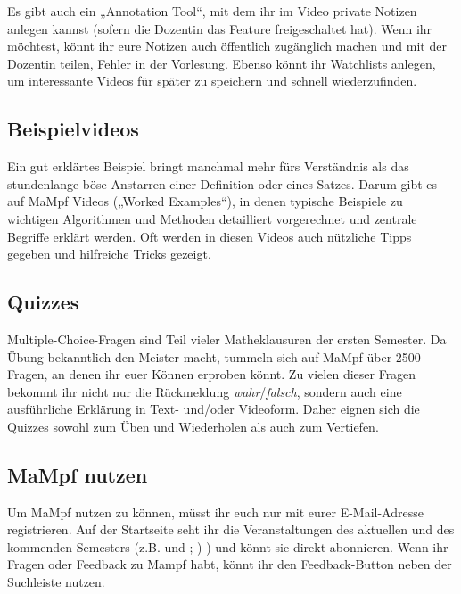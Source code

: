 Es gibt auch ein „Annotation Tool“, mit dem ihr im Video private Notizen anlegen kannst (sofern die Dozentin das Feature freigeschaltet hat). Wenn ihr möchtest, könnt ihr eure Notizen auch öffentlich zugänglich machen und mit der Dozentin teilen, \zB Fehler in der Vorlesung.
Ebenso könnt ihr Watchlists anlegen, um interessante Videos für später zu speichern und schnell wiederzufinden.


\subsection{Beispielvideos}
Ein gut erklärtes Beispiel bringt manchmal mehr fürs Verständnis als das stundenlange böse Anstarren einer Definition oder eines Satzes. Darum gibt es auf MaMpf Videos („Worked Examples“), in denen typische Beispiele zu wichtigen Algorithmen und Methoden detailliert vorgerechnet und zentrale Begriffe erklärt werden. Oft werden in diesen Videos auch nützliche Tipps gegeben und hilfreiche Tricks gezeigt.


\subsection{Quizzes}
Multiple-Choice-Fragen sind Teil vieler Matheklausuren der ersten Semester. Da Übung bekanntlich den Meister macht, tummeln sich auf MaMpf über 2500 Fragen, an denen ihr euer Können erproben könnt. Zu vielen dieser Fragen bekommt ihr nicht nur die Rückmeldung \emph{wahr}/\emph{falsch}, sondern auch eine ausführliche Erklärung in Text- und/oder Videoform. Daher eignen sich die Quizzes sowohl zum Üben und Wiederholen als auch zum Vertiefen.


\subsection{MaMpf nutzen}
Um MaMpf nutzen zu können, müsst ihr euch nur mit eurer E-Mail-Adresse registrieren. Auf der Startseite seht ihr die Veranstaltungen des aktuellen und des kommenden Semesters (z.B.  und  ;-) ) und könnt  sie direkt abonnieren. Wenn ihr Fragen oder Feedback zu Mampf habt, könnt ihr den Feedback-Button neben der Suchleiste nutzen.
